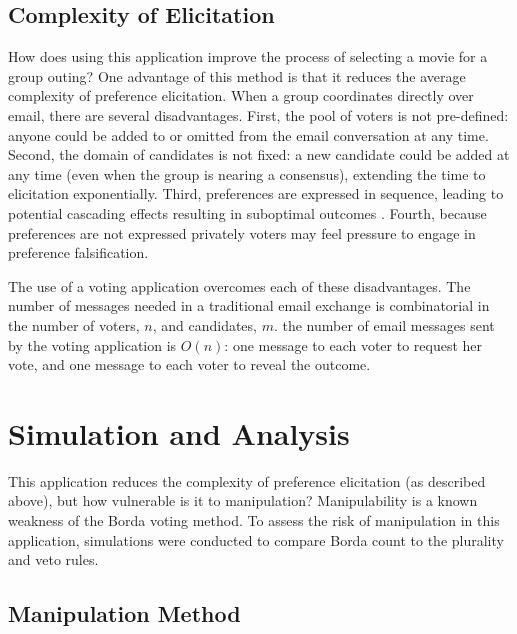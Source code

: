 \documentclass[12pt,letterpaper]{article} %
\begin{document}
\subsection{Complexity of Elicitation}

How does using this application improve the process of selecting a movie for a group outing? One advantage of this method is that it reduces the average complexity of preference elicitation. When a group coordinates directly over email, there are several disadvantages. First, the pool of voters is not pre-defined: anyone could be added to or omitted from the email conversation at any time. Second, the domain of candidates is not fixed: a new candidate could be added at any time (even when the group is nearing a consensus), extending the time to elicitation exponentially. Third, preferences are expressed in sequence, leading to potential cascading effects resulting in suboptimal outcomes \citep{kuran1998availability,miller2004standing}. Fourth, because preferences are not expressed privately voters may feel pressure to engage in preference falsification.

The use of a voting application overcomes each of these disadvantages. The number of messages needed in a traditional email exchange is combinatorial in the number of voters, $n$, and candidates, $m$. the number of email messages sent by the voting application is $O(n)$: one message to each voter to request her vote, and one message to each voter to reveal the outcome.


\section{Simulation and Analysis}

This application reduces the complexity of preference elicitation (as described above), but how vulnerable is it to manipulation? Manipulability is a known weakness of the Borda voting method. To assess the risk of manipulation in this application, simulations were conducted to compare Borda count to the plurality and veto rules. 

\subsection{Manipulation Method}
\end{document}
